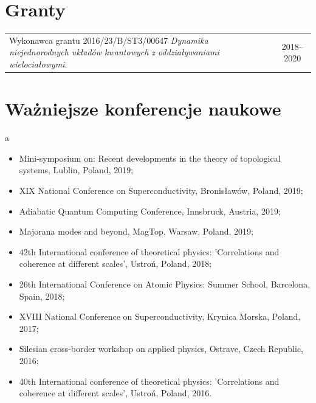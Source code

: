 \ornament

\section*{Granty}

\begin{tabular}{p{12cm}c}
Wykonawca grantu 2016/23/B/ST3/00647 \textit{Dynamika niejednorodnych układów kwantowych z oddziaływaniami wielociałowymi}. & 2018--2020
\end{tabular}

\ornament

\vspace{-0.1cm}

\section*{Ważniejsze konferencje naukowe}

\phantom a
\vspace{-5ex}

\begin{itemize}
\item Mini-symposium on: Recent developments in the theory of topological systems, Lublin, Poland, 2019;

\item XIX National Conference on Superconductivity, Bronisławów, Poland, 2019;

\item Adiabatic Quantum Computing Conference, Innsbruck, Austria, 2019;

\item Majorana modes and beyond, MagTop, Warsaw, Poland, 2019;

\item 42th International conference of theoretical physics: ’Correlations and coherence at different scales’, Ustroń, Poland, 2018;

\item 26th International Conference on Atomic Physics: Summer School, Barcelona, Spain, 2018;

\item XVIII National Conference on Superconductivity, Krynica Morska, Poland, 2017;

\item Silesian cross-border workshop on applied physics, Ostrave, Czech Republic, 2016;

\item 40th International conference of theoretical physics: ’Correlations and coherence at different scales’, Ustroń, Poland, 2016.
\end{itemize}

\ornament